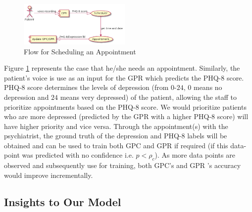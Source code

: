 \documentclass{article}
\begin{document}
    \begin{figure}[h]
         \begin{center}
        \includegraphics[width=0.48\textwidth]{appointment} 
          \end{center}
          \caption{Flow for Scheduling an Appointment}
          \label{sch_app} 
     \end{figure}

    Figure \ref{sch_app} represents the case that he/she needs an appointment. 
    Similarly, the patient's voice is use as an input for the GPR which predicts the PHQ-8 score. 
    PHQ-8 score determines the levels of depression (from $0$-$24$, $0$ means no depression and $24$ means very depressed) of the patient, allowing the staff to prioritize appointments based on the PHQ-8 score.
    We would prioritize patients who are more depressed (predicted by the GPR with a higher PHQ-8 score) will have higher priority and vice versa.
    Through the appointment(s) with the psychiatrist, the ground truth of the depression and PHQ-8 labels will be obtained and can be used to train both GPC and GPR if required (if this data-point was predicted with no confidence i.e. $p < \rho_c$).
    As more data points are observed and subsequently use for training, both GPC's and GPR 's accuracy would improve incrementally.

    \subsection{Insights to Our Model}
\end{document}
